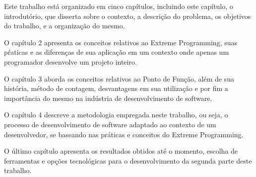 Este trabalho está organizado em cinco capítulos, incluindo este capítulo, o
introdutório, que disserta sobre o contexto, a descrição do problema, os
objetivos do trabalho, e a organização do mesmo.

O capítulo 2 apresenta os conceitos relativos ao Extreme Programming, suas
pŕaticas e as diferenças de sua aplicação em um contexto onde apenas um
programador desenvolve um projeto inteiro.

O capítulo 3 aborda os conceitos relativos ao Ponto de Função, além de sua história, método de contagem, desvantagens em sua utilização e por fim  a
importância do mesmo na indústria de desenvolvimento de software.

O capítulo 4 descreve a metodologia empregada neste trabalho, ou seja,
o processo de desenvolvimento de software adaptado ao contexto de um
desenvolvedor, se baseando nas práticas e conceitos do Extreme Programming.

O último capítulo apresenta os resultados obtidos até o momento, escolha de
ferramentas e opções tecnológicas para o desenvolvimento da segunda parte deste
trabalho.
